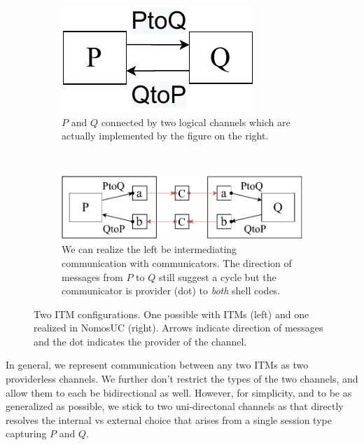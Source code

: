 \begin{figure}
	\begin{subfigure}{0.3\textwidth}
	\centering
	\includegraphics[scale=0.4]{figures/p_and_q.pdf}
	\caption{$P$ and $Q$ connected by two logical channels which are actually implemented by the figure on the right.}
	\label{fig:pandq}
	\end{subfigure}
	~ \ \ \ \ 
	\begin{subfigure}{0.6\textwidth}
	\centering
	\includegraphics[scale=0.4]{figures/new_p_and_q.pdf}
	\caption{We can realize the left be intermediating communication with communicators. The direction of messages from $P$ to $Q$ still suggest a cycle but the communicator is provider (dot) to \emph{both} shell codes.}
	\label{fig:newpandq}
	\end{subfigure}
	\caption{Two ITM configurations. One possible with ITMs (left) and one realized in NomosUC (right). Arrows indicate direction of messages and the dot indicates the provider of the channel.}
	\vspace{-5mm}
\end{figure}

In general, we represent communication between any two ITMs as two providerless channels.
We further don't restrict the types of the two channels, and allow them to each be bidirectional as well.
However, for simplicity, and to be as generalized as possible, we stick to two uni-directonal channels as that directly resolves the internal vs external choice that arises from a single session type capturing $P$ and $Q$.

